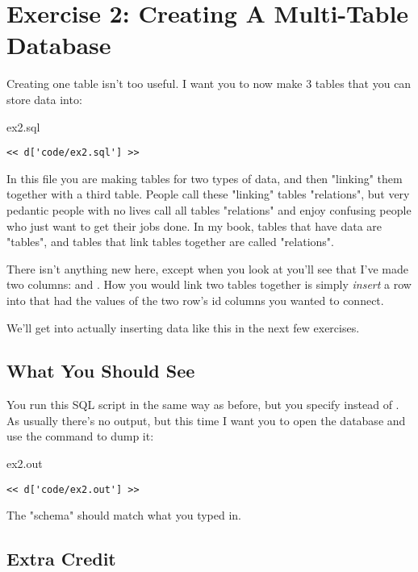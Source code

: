 \chapter{Exercise 2: Creating A Multi-Table Database}

Creating one table isn't too useful.  I want you to now make 3 tables that 
you can store data into:

\begin{code}{ex2.sql}
\begin{Verbatim}
<< d['code/ex2.sql'] >>
\end{Verbatim}
\end{code}

In this file you are making tables for two types of data, and then
"linking" them together with a third table.  People call these 
"linking" tables "relations", but very pedantic people with no
lives call all tables "relations" and enjoy confusing people who
just want to get their jobs done.  In my book, tables that have data
are "tables", and tables that link tables together are called "relations".

There isn't anything new here, except when you look at 
you'll see that I've made two columns:  and .
How you would link two tables together is simply \emph{insert} a row
into  that had the values of the two row's id columns
you wanted to connect.

We'll get into actually inserting data like this in the next few exercises.

\section{What You Should See}

You run this SQL script in the same way as before, but you specify
 instead of .  As usually there's no output,
but this time I want you to open the database and use the 
 command to dump it:

\begin{code}{ex2.out}
\begin{Verbatim}
<< d['code/ex2.out'] >>
\end{Verbatim}
\end{code}

The "schema" should match what you typed in.

\section{Extra Credit}

